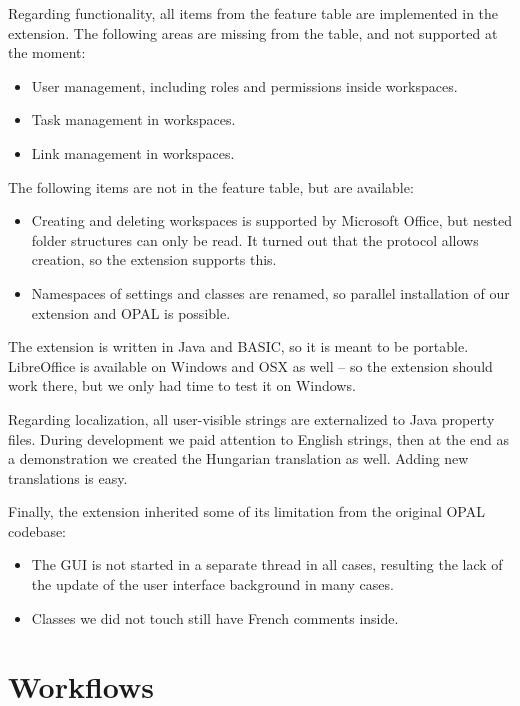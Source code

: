 Regarding functionality, all items from the feature table are implemented in
the extension. The following areas are missing from the table, and not
supported at the moment:

\begin{itemize}
\item User management, including roles and permissions inside workspaces.
\item Task management in workspaces.
\item Link management in workspaces.
\end{itemize}

The following items are not in the feature table, but are available:

\begin{itemize}
\item Creating and deleting workspaces is supported by Microsoft Office, but nested
folder structures can only be read. It turned out that the protocol allows
creation, so the extension supports this.
\item Namespaces of settings and classes are renamed, so parallel installation
of our extension and OPAL is possible.
\end{itemize}

The extension is written in Java and BASIC, so it is meant to be portable.
LibreOffice is available on Windows and OSX as well -- so the extension should
work there, but we only had time to test it on Windows.

Regarding localization, all user-visible strings are externalized to Java
property files. During development we paid attention to English strings, then at
the end as a demonstration we created the Hungarian translation as well. Adding
new translations is easy.

Finally, the extension inherited some of its limitation from the original OPAL
codebase:

\begin{itemize}
\item The GUI is not started in a separate thread in all cases, resulting the
lack of the update of the user interface background in many cases.
\item Classes we did not touch still have French comments inside.
\end{itemize}

\section{Workflows}

